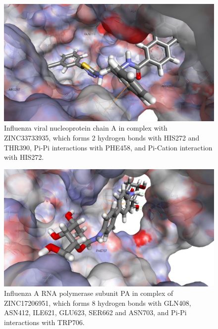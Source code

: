 \begin{figure}
\centering
\includegraphics[width=\linewidth]{Case/2IQH-ZINC33733935.png}
\caption{Influenza viral nucleoprotein chain A in complex with ZINC33733935, which forms 2 hydrogen bonds with HIS272 and THR390, Pi-Pi interactions with PHE458, and Pi-Cation interaction with HIS272.}
\label{Case:2IQH-ZINC33733935}
\end{figure}

\begin{figure}
\centering
\includegraphics[width=\linewidth]{Case/2ZNL-ZINC17206951.png}
\caption{Influenza A RNA polymerase subunit PA in complex of ZINC17206951, which forms 8 hydrogen bonds with GLN408, ASN412, ILE621, GLU623, SER662 and ASN703, and Pi-Pi interactions with TRP706.}
\label{Case:2ZNL-ZINC17206951}
\end{figure}

